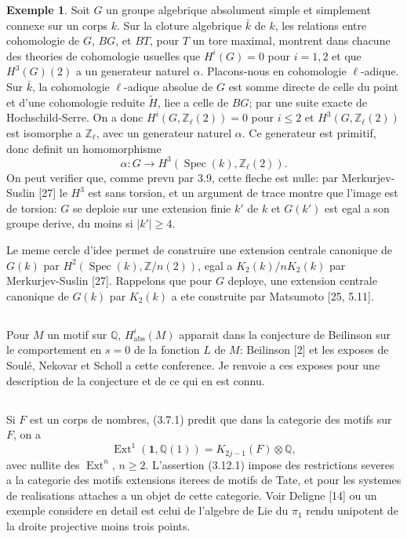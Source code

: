 \documentclass[11pt,a4paper]{article}
\theoremstyle{plain}
\theoremstyle{definition}
\newtheorem{example}[theorem]{Exemple}
\DeclareMathOperator{\Ext}{Ext}
\DeclareMathOperator{\Spec}{Spec}
\newcommand{\Q}{\mathbb{Q}}
\newcommand{\Z}{\mathbb{Z}}
\newcommand{\abs}{\mathrm{abs}}
\begin{document}
\begin{example}
Soit $G$ un groupe algebrique absolument simple et simplement connexe sur un corps $k$. Sur la cloture algebrique $\bar{k}$ de $k$, les relations entre cohomologie de $G$, $BG$, et $BT$, pour $T$ un tore maximal, montrent dans chacune des theories de cohomologie usuelles que $H^i(G) = 0$ pour $i = 1, 2$ et que $H^3(G)(2)$ a un generateur naturel $\alpha$. Placons-nous en cohomologie $\ell$-adique. Sur $\bar{k}$, la cohomologie $\ell$-adique absolue de $G$ est somme directe de celle du point et d'une cohomologie reduite $\tilde{H}$, liee a celle de $BG$; par une suite exacte de Hochschild-Serre. On a donc $H^i(G, \Z_\ell(2)) = 0$ pour $i \leq 2$ et $H^3(G, \Z_\ell(2))$ est isomorphe a $\Z_\ell$, avec un generateur naturel $\alpha$. Ce generateur est primitif, donc definit un homomorphisme
$$
\alpha: G \to H^3(\Spec(k), \Z_\ell(2)).
$$
On peut verifier que, comme prevu par 3.9, cette fleche est nulle: par Merkurjev-Suslin [27] le $H^3$ est sans torsion, et un argument de trace montre que l'image est de torsion: $G$ se deploie sur une extension finie $k'$ de $k$ et $G(k')$ est egal a son groupe derive, du moins si $|k'| \geq 4$.

Le meme cercle d'idee permet de construire une extension centrale canonique de $G(k)$ par $H^2(\Spec(k), \Z/n(2))$, egal a $K_2(k)/nK_2(k)$ par Merkurjev-Suslin [27]. Rappelons que pour $G$ deploye, une extension centrale canonique de $G(k)$ par $K_2(k)$ a ete construite par Matsumoto [25, 5.11].
\end{example}

\subsection{}

Pour $M$ un motif sur $\Q$, $H^i_{\abs}(M)$ apparait dans la conjecture de Beilinson sur le comportement en $s = 0$ de la fonction $L$ de $M$: Beilinson [2] et les exposes de Soul\'e, Nekovar et Scholl a cette conference. Je renvoie a ces exposes pour une description de la conjecture et de ce qui en est connu.

\subsection{}

Si $F$ est un corps de nombres, (3.7.1) predit que dans la categorie des motifs sur $F$, on a
\begin{equation}
\tag{3.12.1}
\Ext^1(\mathbf{1}, \Q(1)) = K_{2j-1}(F) \otimes \Q,
\end{equation}
avec nullite des $\Ext^n$, $n \geq 2$. L'assertion (3.12.1) impose des restrictions severes a la categorie des motifs extensions iterees de motifs de Tate, et pour les systemes de realisations attaches a un objet de cette categorie. Voir Deligne [14] ou un exemple considere en detail est celui de l'algebre de Lie du $\pi_1$ rendu unipotent de la droite projective moins trois points.
\end{document}

